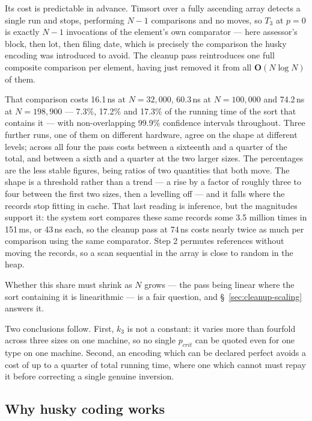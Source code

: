 \documentclass[twoside,leqno,twocolumn]{article}
\begin{document}
Its cost is predictable in advance.
Timsort over a fully ascending array detects a single run and stops,
performing $N-1$ comparisons and no moves,
so $T_3$ at $p = 0$ is exactly $N-1$ invocations of the element's own comparator ---
here assessor's block, then lot, then filing date,
which is precisely the comparison the husky encoding was introduced to avoid.
The cleanup pass reintroduces one full composite comparison per element,
having just removed it from all $\textbf{O}(N \log N)$ of them.

That comparison costs 16.1\,ns at $N = 32{,}000$, 60.3\,ns at $N = 100{,}000$ and 74.2\,ns at
$N = 198{,}900$ --- 7.3\%, 17.2\% and 17.3\% of the running time of the sort that contains it ---
with non-overlapping 99.9\% confidence intervals throughout.
Three further runs, one of them on different hardware, agree on the shape at different levels;
across all four the pass costs between a sixteenth and a quarter of the total,
and between a sixth and a quarter at the two larger sizes.
The percentages are the less stable figures, being ratios of two quantities that both move.
The shape is a threshold rather than a trend --- a rise by a factor of roughly three to four between the first two sizes,
then a levelling off --- and it falls where the records stop fitting in cache.
That last reading is inference, but the magnitudes support it:
the system sort compares these same records some 3.5 million times in 151\,ms, or 43\,ns each,
so the cleanup pass at 74\,ns costs nearly twice as much per comparison using the same comparator.
Step 2 permutes references without moving the records,
so a scan sequential in the array is close to random in the heap.

Whether this share must shrink as $N$ grows --- the pass being linear where the sort containing it is
linearithmic --- is a fair question, and \S~\ref{sec:cleanup-scaling} answers it.

Two conclusions follow.
First, $k_3$ is not a constant: it varies more than fourfold across three sizes on one machine,
so no single $p_{crit}$ can be quoted even for one type on one machine.
Second, an encoding which can be declared perfect avoids a cost of up to a quarter of total running
time, where one which cannot must repay it before correcting a single genuine inversion.

\subsection{Why husky coding works}
\label{sec:why-husky}
\end{document}
